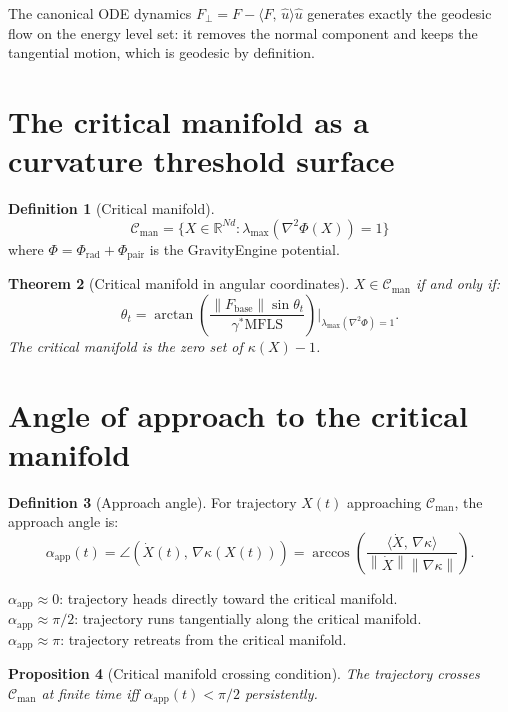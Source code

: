 \documentclass[11pt,a4paper,openany]{book}
\newtheorem{theorem}{Theorem}[chapter]
\newtheorem{proposition}[theorem]{Proposition}
\theoremstyle{definition}
\newtheorem{definition}[theorem]{Definition}
\newcommand{\R}{\mathbb{R}}
\newcommand{\norm}[1]{\left\|#1\right\|}
\newcommand{\inner}[2]{\langle #1,\,#2\rangle}
\newcommand{\Fbase}{F_{\mathrm{base}}}
\newcommand{\mfls}{\mathrm{MFLS}}
\begin{document}
The canonical ODE dynamics $F_\perp = F - \inner{F}{\hat u}\hat u$ generates
exactly the geodesic flow on the energy level set: it removes the normal component
and keeps the tangential motion, which is geodesic by definition.

\section{The critical manifold as a curvature threshold surface}

\begin{definition}[Critical manifold]
\[
\mathcal{C}_\mathrm{man} = \{X \in \R^{Nd} : \lambda_\mathrm{max}(\nabla^2\Phi(X)) = 1\}
\]
where $\Phi = \Phi_\mathrm{rad} + \Phi_\mathrm{pair}$ is the GravityEngine potential.
\end{definition}

\begin{theorem}[Critical manifold in angular coordinates]
$X \in \mathcal{C}_\mathrm{man}$ if and only if:
\[
\theta_t = \arctan\!\left(\frac{\norm{\Fbase}\sin\theta_t}{\gamma^*\mfls}\right)
\bigg|_{\lambda_\mathrm{max}(\nabla^2\Phi) = 1}.
\]
The critical manifold is the zero set of $\kappa(X) - 1$.
\end{theorem}

\section{Angle of approach to the critical manifold}

\begin{definition}[Approach angle]
For trajectory $X(t)$ approaching $\mathcal{C}_\mathrm{man}$, the approach angle is:
\[
\alpha_\mathrm{app}(t) = \angle(\dot X(t),\, \nabla\kappa(X(t))) = \arccos\!\left(
\frac{\inner{\dot X}{\nabla\kappa}}{\norm{\dot X}\norm{\nabla\kappa}}\right).
\]
\end{definition}

$\alpha_\mathrm{app} \approx 0$: trajectory heads directly toward the critical manifold.\\
$\alpha_\mathrm{app} \approx \pi/2$: trajectory runs tangentially along the critical manifold.\\
$\alpha_\mathrm{app} \approx \pi$: trajectory retreats from the critical manifold.

\begin{proposition}[Critical manifold crossing condition]
The trajectory crosses $\mathcal{C}_\mathrm{man}$ at finite time iff $\alpha_\mathrm{app}(t) < \pi/2$
persistently.
\end{proposition}
\end{document}
